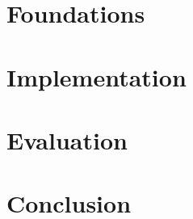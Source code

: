 \documentclass[smallcondensed]{svjour3}     %
\begin{document}
\section{Foundations}

\section{Implementation}

\renewcommand{\lstlistingname}{Code}

\section{Evaluation}

\section{Conclusion}


\end{document}
